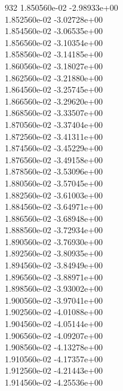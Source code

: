 932	1.850560e-02	-2.98933e+00	\\ 	1.852560e-02	-3.02728e+00	\\ 	1.854560e-02	-3.06535e+00	\\ 	1.856560e-02	-3.10354e+00	\\ 	1.858560e-02	-3.14185e+00	\\ 	1.860560e-02	-3.18027e+00	\\ 	1.862560e-02	-3.21880e+00	\\ 	1.864560e-02	-3.25745e+00	\\ 	1.866560e-02	-3.29620e+00	\\ 	1.868560e-02	-3.33507e+00	\\ 	1.870560e-02	-3.37404e+00	\\ 	1.872560e-02	-3.41311e+00	\\ 	1.874560e-02	-3.45229e+00	\\ 	1.876560e-02	-3.49158e+00	\\ 	1.878560e-02	-3.53096e+00	\\ 	1.880560e-02	-3.57045e+00	\\ 	1.882560e-02	-3.61003e+00	\\ 	1.884560e-02	-3.64971e+00	\\ 	1.886560e-02	-3.68948e+00	\\ 	1.888560e-02	-3.72934e+00	\\ 	1.890560e-02	-3.76930e+00	\\ 	1.892560e-02	-3.80935e+00	\\ 	1.894560e-02	-3.84949e+00	\\ 	1.896560e-02	-3.88971e+00	\\ 	1.898560e-02	-3.93002e+00	\\ 	1.900560e-02	-3.97041e+00	\\ 	1.902560e-02	-4.01088e+00	\\ 	1.904560e-02	-4.05144e+00	\\ 	1.906560e-02	-4.09207e+00	\\ 	1.908560e-02	-4.13278e+00	\\ 	1.910560e-02	-4.17357e+00	\\ 	1.912560e-02	-4.21443e+00	\\ 	1.914560e-02	-4.25536e+00	\\ \hline
